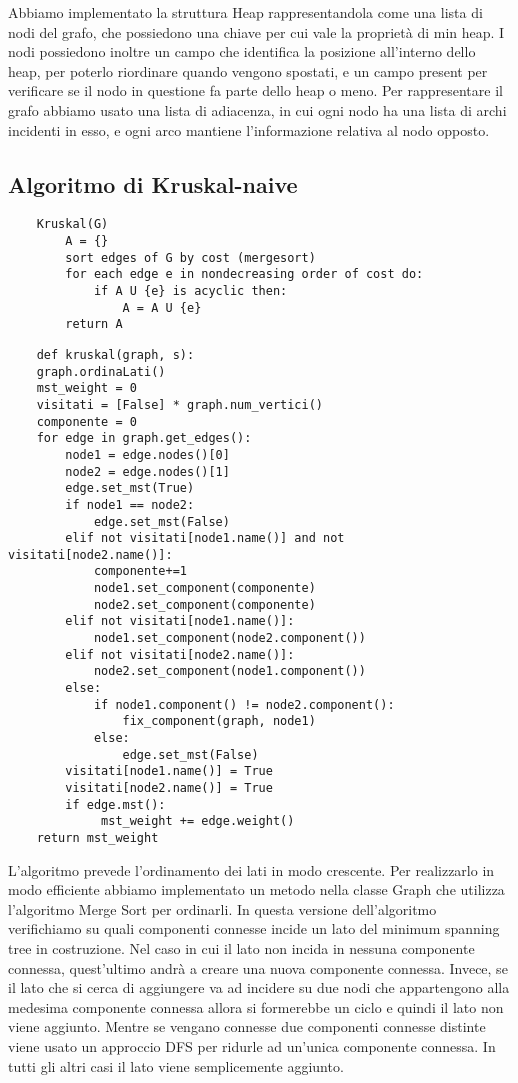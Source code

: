 Abbiamo implementato la struttura Heap rappresentandola come una lista di nodi del grafo, che possiedono una chiave per cui vale la proprietà di min heap.
I nodi possiedono inoltre un campo che identifica la posizione all'interno dello heap, per poterlo riordinare quando vengono spostati, e un campo present per verificare se il nodo in questione fa parte dello heap o meno.
Per rappresentare il grafo abbiamo usato una lista di adiacenza, in cui ogni nodo ha una lista di archi incidenti in esso, e ogni arco mantiene l'informazione relativa al nodo opposto.

\clearpage

\subsection{Algoritmo di Kruskal-naive}
\begin{verbatim}
    Kruskal(G)
        A = {}
        sort edges of G by cost (mergesort)
        for each edge e in nondecreasing order of cost do:
            if A U {e} is acyclic then:
                A = A U {e}
        return A
\end{verbatim}    

\begin{verbatim}
    def kruskal(graph, s):
    graph.ordinaLati()
    mst_weight = 0
    visitati = [False] * graph.num_vertici()
    componente = 0
    for edge in graph.get_edges(): 
        node1 = edge.nodes()[0]
        node2 = edge.nodes()[1]
        edge.set_mst(True)
        if node1 == node2:
            edge.set_mst(False)
        elif not visitati[node1.name()] and not visitati[node2.name()]:
            componente+=1
            node1.set_component(componente)
            node2.set_component(componente)
        elif not visitati[node1.name()]:
            node1.set_component(node2.component())
        elif not visitati[node2.name()]:
            node2.set_component(node1.component())
        else:
            if node1.component() != node2.component():
                fix_component(graph, node1)
            else:
                edge.set_mst(False)
        visitati[node1.name()] = True
        visitati[node2.name()] = True        
        if edge.mst():
             mst_weight += edge.weight()          
    return mst_weight
\end{verbatim}

L'algoritmo prevede l'ordinamento dei lati in modo crescente.
Per realizzarlo in modo efficiente abbiamo implementato un metodo nella classe Graph che utilizza l'algoritmo Merge Sort per ordinarli.
In questa versione dell'algoritmo verifichiamo su quali componenti connesse incide un lato del minimum spanning tree in costruzione.
Nel caso in cui il lato non incida in nessuna componente connessa, quest'ultimo andrà a creare una nuova componente connessa.
Invece, se il lato che si cerca di aggiungere va ad incidere su due nodi che appartengono alla medesima componente connessa allora si formerebbe un ciclo e quindi il lato non viene aggiunto.
Mentre se vengano connesse due componenti connesse distinte viene usato un approccio DFS per ridurle ad un'unica componente connessa.
In tutti gli altri casi il lato viene semplicemente aggiunto.

